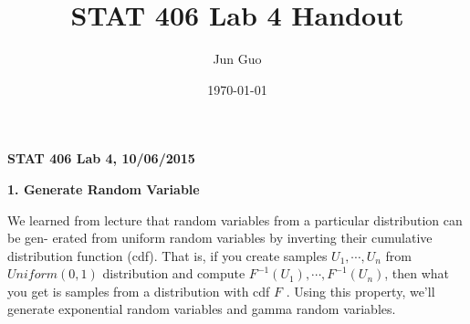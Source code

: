 \documentclass[letter,10.5pt]{article}
\title{\textbf{STAT 406 Lab 4 Handout}}
\author{Jun Guo}
\date{\today}
\numberwithin{equation}{subsection}
\begin{document}
\begin{center}
\large
\textbf{STAT 406 Lab 4, 10/06/2015}
\end{center}\vspace*{5mm}


\noindent
\textbf{1. Generate Random Variable}

\normalsize
\noindent
We learned from lecture that random variables from a particular distribution can be gen- erated from uniform random variables by inverting their cumulative distribution function (cdf). That is, if you create samples $U_1, \cdots , U_n$ from $Uniform(0, 1)$ distribution and compute $F^{-1}(U_1), \cdots , F^{-1}(U_n)$, then what you get is samples from a distribution with cdf $F$ . Using this property, we'll generate exponential random variables and gamma random variables.
\end{document}
